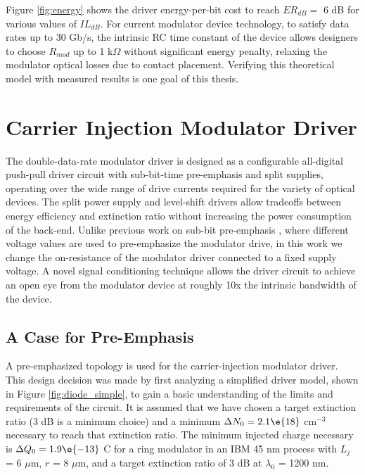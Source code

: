 Figure \ref{fig:energy} shows the driver energy-per-bit cost to 
reach $ER_{dB}=$ 6 dB for various values of $IL_{dB}$.  For current 
modulator device technology, to satisfy data rates up to 30 Gb/s, 
the intrinsic RC time constant of the device allows designers to 
choose $R_{mod}$ up to 1 k$\Omega$ without significant energy penalty, relaxing the modulator optical losses due to contact placement.  Verifying this theoretical model with measured results is one goal of this thesis.



\section{Carrier Injection Modulator Driver}

The double-data-rate modulator driver is designed as a configurable all-digital push-pull driver circuit with sub-bit-time pre-emphasis and split supplies, operating over the wide range of drive currents required for the variety of optical devices. 
The split power supply and level-shift drivers allow tradeoffs between energy efficiency and extinction ratio without increasing the power consumption of the back-end.  Unlike previous work on sub-bit pre-emphasis \cite{xu_osa07}, where different voltage values are used to pre-emphasize the modulator drive, in this work we change the on-resistance of the modulator driver connected to a fixed supply voltage.  A novel signal conditioning technique allows the driver circuit to achieve an open eye from the modulator device at roughly 10x the intrinsic bandwidth of the device.

\subsection{A Case for Pre-Emphasis}

A pre-emphasized topology is used for the carrier-injection modulator driver.  This design decision was made by first analyzing a simplified driver model, shown in Figure \ref{fig:diode_simple}, to gain a basic understanding of the limits and requirements of the circuit.  It is assumed that we have chosen a target extinction ratio (3 dB is a minimum choice) and a minimum $\Delta N_0 = 2.1\e{18}$ cm$^{-3}$ necessary to reach that extinction ratio. 
The minimum injected charge necessary is $\Delta Q_0 = 1.9\e{-13}$ C for a ring modulator in an IBM 45 nm process with $L_j$ = 6 $\mu$m, $r$ = 8 $\mu$m, and a target extinction ratio of 3 dB at $\lambda_0$ = 1200 nm.

